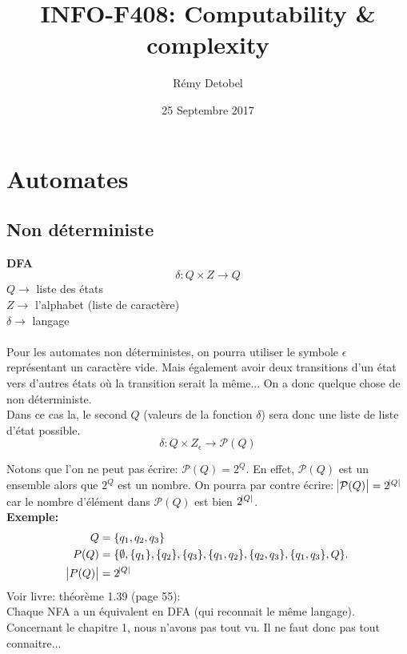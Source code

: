 \documentclass[a4paper,12pt]{article}
\title{INFO-F408: Computability \& complexity}
\author{Rémy Detobel}
\date{25 Septembre 2017}
\begin{document}
\maketitle
\newpage

\section{Automates}
  \subsection{Non déterministe}
    \textbf{DFA}
    $$\delta : Q \times Z \rightarrow Q$$
    $Q \rightarrow$ liste des états\\
    $Z \rightarrow$ l'alphabet (liste de caractère)\\
    $\delta \rightarrow$ langage\\
    \\
    Pour les automates non déterministes, on pourra utiliser le symbole $\epsilon$ représentant un caractère vide.  Mais également avoir deux transitions d'un état vers d'autres états où la transition serait la même...  On a donc quelque chose de non déterministe.\\
    Dans ce cas la, le second $Q$ (valeurs de la fonction $\delta$) sera donc une liste de liste d'état possible.\\
    $$\delta : Q \times Z_{\epsilon} \rightarrow \mathcal P(Q)$$
    
    Notons que l'on ne peut pas écrire: $\mathcal P(Q) = 2^Q$.  En effet, $\mathcal P(Q)$ est un ensemble alors que $2^Q$ est un nombre.  On pourra par contre écrire: $\abs {\mathcal P(Q)} = 2^{\abs {Q}}$ car le nombre d'élément dans $\mathcal P(Q)$ est bien $2^{\abs {Q}}$.
		\\
    \textbf{Exemple:}\\
    \begin{align*}
      Q &= \{q_1, q_2, q_3\}\\
      P(Q) &= \{\emptyset, \{q_1\}, \{q_2\}, \{q_3\}, \{q_1, q_2\}, \{q_2, q_3\}, \{q_1, q_3\}, Q\}.\\
      \abs {P(Q)} &= 2^{\abs Q}
    \end{align*}
    Voir livre: théorème 1.39 (page 55):\\
    Chaque NFA a un équivalent en DFA (qui reconnait le même langage).\\
    Concernant le chapitre 1, nous n'avons pas tout vu. Il ne faut donc pas tout connaitre...
\end{document}
